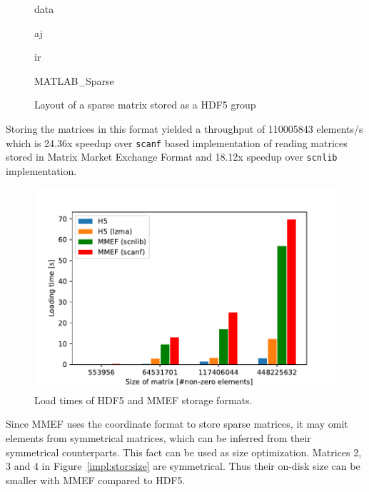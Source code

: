 \documentclass[thesis=M,english]{FITthesis}[2019/12/23]
\begin{document}
\begin{figure}[!h]
    \begin{tcolorbox}[title=/A, colback=gray!30!white]
        \begin{infobox}[colback=hdtsc]
            data
        \end{infobox}
        \begin{infobox}[colback=hdtsc]
            aj
        \end{infobox}
        \begin{infobox}[colback=hdtsc]
            ir
        \end{infobox}
        \begin{infobox}[colback=hdatc, width=0.35\textwidth]
            MATLAB\_Sparse
        \end{infobox}
    \end{tcolorbox}
    \caption{Layout of a sparse matrix stored as a HDF5 group}
\end{figure}

Storing the matrices in this format yielded a throughput of \num{110005843} elements/s which is 24.36x speedup
over \texttt{scanf} based implementation of reading matrices stored in Matrix Market Exchange Format
and 18.12x speedup over \texttt{scnlib} implementation.

\begin{figure}[htp]
    \centering
    \includegraphics[scale=0.65]{static/mmef_vs_h5.pdf}
    \caption{Load times of HDF5 and MMEF storage formats.}\label{impl:stor:speed}
\end{figure}


Since MMEF uses the coordinate format to store sparse matrices, it may omit elements from symmetrical matrices, which can be inferred
from their symmetrical counterparts. This fact can be used as size optimization. Matrices 2, 3 and 4 in Figure~\ref{impl:stor:size}
are symmetrical. Thus their on-disk size can be smaller with MMEF compared to HDF5.
\end{document}
